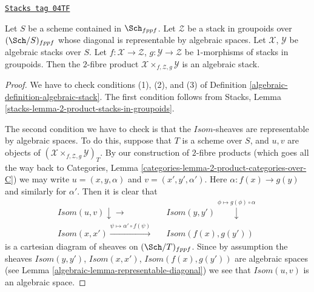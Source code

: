 \begin{lemma}
\label{algebraic-lemma-2-fibre-product-general}
\href{https://stacks.math.columbia.edu/tag/04TF}{\texttt{Stacks tag 04TF}}

Let $S$ be a scheme contained in $\Sch_{fppf}$.
Let $\mathcal{Z}$ be a stack in groupoids over $(\Sch/S)_{fppf}$
whose diagonal is representable by algebraic spaces.
Let $\mathcal{X}$, $\mathcal{Y}$ be algebraic stacks over $S$.
Let $f : \mathcal{X} \to \mathcal{Z}$, $g : \mathcal{Y} \to \mathcal{Z}$
be $1$-morphisms of stacks in groupoids. Then the $2$-fibre product
$\mathcal{X} \times_{f, \mathcal{Z}, g} \mathcal{Y}$ is an algebraic stack.
\end{lemma}

\begin{proof}

We have to check conditions (1), (2), and (3) of
Definition \ref{algebraic-definition-algebraic-stack}.
The first condition follows from
Stacks, Lemma \ref{stacks-lemma-2-product-stacks-in-groupoids}.

\medskip\noindent
The second condition we have to check is that the $\mathit{Isom}$-sheaves
are representable by algebraic spaces. To do this, suppose that
$T$ is a scheme over $S$, and $u, v$ are objects of
$(\mathcal{X} \times_{f, \mathcal{Z}, g} \mathcal{Y})_T$.
By our construction of $2$-fibre products (which goes all the way
back to
Categories, Lemma \ref{categories-lemma-2-product-categories-over-C})
we may write $u = (x, y, \alpha)$ and $v = (x', y', \alpha')$.
Here $\alpha : f(x) \to g(y)$ and similarly for $\alpha'$.
Then it is clear that
$$
\begin{array}{ccc}\mathit{Isom}(u, v) \downarrow\longrightarrow &  & \mathit{Isom}(y, y') \overset{\phi \mapsto g(\phi) \circ \alpha}{\downarrow} \\ \mathit{Isom}(x, x') \overset{\psi \mapsto \alpha' \circ f(\psi)}{\longrightarrow} &  & \mathit{Isom}(f(x), g(y'))\end{array}
$$
is a cartesian diagram of sheaves on $(\Sch/T)_{fppf}$.
Since by assumption the sheaves
$\mathit{Isom}(y, y')$, $\mathit{Isom}(x, x')$, $\mathit{Isom}(f(x), g(y'))$
are algebraic spaces (see
Lemma \ref{algebraic-lemma-representable-diagonal})
we see that $\mathit{Isom}(u, v)$
is an algebraic space.


\end{proof}
